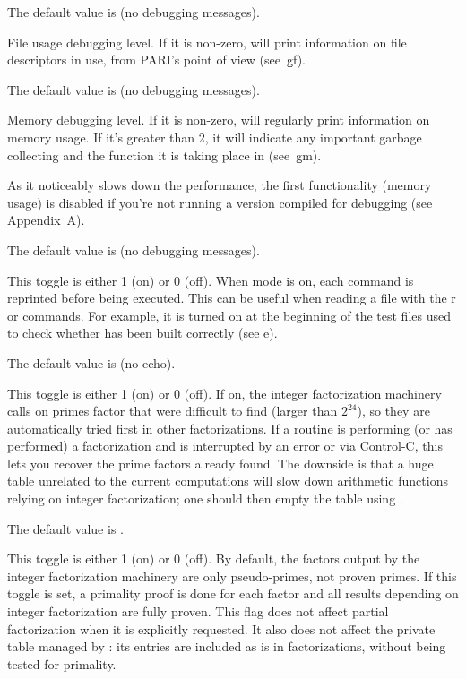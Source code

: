{The default value is  (no debugging messages).

\label{se:def,debugfiles}
File usage debugging level. If it is non-zero,  will print
information on file descriptors in use, from PARI's point of view
(see~\b{gf}).

The default value is  (no debugging messages).

\label{se:def,debugmem}
Memory debugging level. If it is non-zero,  will regularly print
information on memory usage. If it's greater than 2, it will indicate any
important garbage collecting and the function it is taking place in
(see~\b{gm}).

 As it noticeably slows down the performance,
the first functionality (memory usage) is disabled if you're not running a
version compiled for debugging (see Appendix~A).

The default value is  (no debugging messages).

\label{se:def,echo}
This toggle is either 1 (on) or 0 (off). When 
mode is on, each command is reprinted before being executed. This can be
useful when reading a file with the \b{r} or  commands. For
example, it is turned on at the beginning of the test files used to check
whether  has been built correctly (see \b{e}).

The default value is  (no echo).

\label{se:def,factor_add_primes}
This toggle is either 1 (on) or 0 (off). If on,
the integer factorization machinery calls  on primes
factor that were difficult to find (larger than $2^24$), so they are
automatically tried first in other factorizations. If a routine is performing
(or has performed) a factorization and is interrupted by an error or via
Control-C, this lets you recover the prime factors already found. The
downside is that a huge  table unrelated to the current
computations will slow down arithmetic functions relying on integer
factorization; one should then empty the table using .

The default value is .

\label{se:def,factor_proven}
This toggle is either 1 (on) or 0 (off). By
default, the factors output by the integer factorization machinery are
only pseudo-primes, not proven primes. If this toggle is
set, a primality proof is done for each factor and all results depending on
integer factorization are fully proven. This flag does not affect partial
factorization when it is explicitly requested. It also does not affect the
private table managed by : its entries are included as is in
factorizations, without being tested for primality.

}
